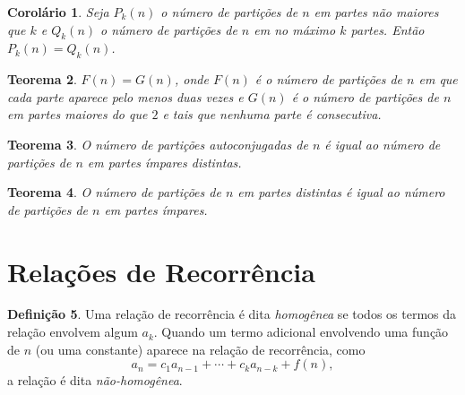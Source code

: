 \documentclass[12pt]{article}
\theoremstyle{plain}
\newtheorem{thm}{Teorema}[section]
\newtheorem{cor}[thm]{Corolário}
\theoremstyle{definition}
\newtheorem{defn}[thm]{Definição}
\theoremstyle{remark}
\begin{document}
\begin{cor}
    Seja \(P_k(n)\) o número de partições de \(n\) em partes não maiores que \(k\) e \(Q_k(n)\) o número de partições de \(n\) em no máximo \(k\) partes. Então \(P_k(n) = Q_k(n)\).
\end{cor}

\begin{thm}
    \(F(n) = G(n)\), onde \(F(n)\) é o número de partições de \(n\) em que cada parte aparece pelo menos duas vezes e \(G(n)\) é o número de partições de \(n\) em partes maiores do que \(2\) e tais que nenhuma parte é consecutiva.
\end{thm}

\begin{thm}
    O número de partições autoconjugadas de \(n\) é igual ao número de partições de \(n\) em partes ímpares distintas.
\end{thm}

\begin{thm}
    O número de partições de \(n\) em partes distintas é igual ao número de partições de \(n\) em partes ímpares.
\end{thm}

\section{Relações de Recorrência}

\begin{defn}
    Uma relação de recorrência é dita \emph{homogênea} se todos os termos da relação envolvem algum \(a_k\). Quando um termo adicional envolvendo uma função de \(n\) (ou uma constante) aparece na relação de recorrência, como 
    \begin{equation}
        a_n = c_1 a_{n-1} + \cdots + c_k a_{n-k} + f(n),
    \end{equation}
    \noindent a relação é dita \emph{não-homogênea}.
\end{defn}
\end{document}
